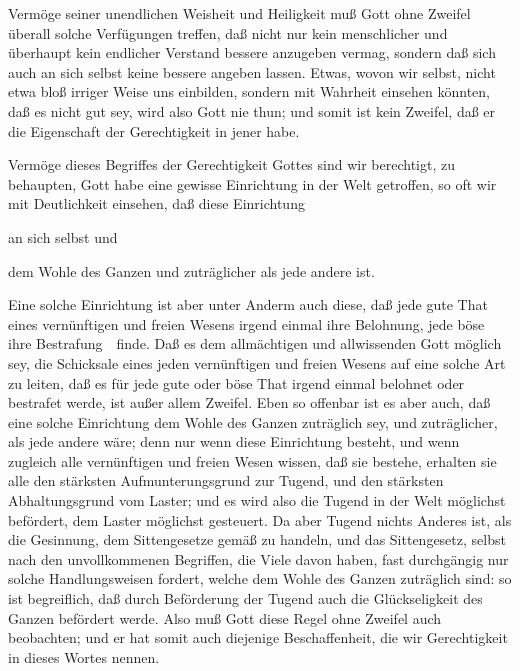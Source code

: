 \begin{aufza}
\item Vermöge seiner unendlichen Weisheit und Heiligkeit muß Gott ohne Zweifel überall solche Verfügungen treffen, daß nicht nur kein menschlicher und überhaupt kein endlicher Verstand bessere anzugeben vermag, sondern daß sich auch an sich selbst keine bessere angeben lassen. Etwas, wovon wir selbst, nicht etwa bloß irriger Weise uns einbilden, sondern mit Wahrheit einsehen könnten, daß es nicht gut sey, wird also Gott nie thun; und somit ist kein Zweifel, daß er die Eigenschaft der Gerechtigkeit in jener  habe.
\item Vermöge dieses Begriffes der Gerechtigkeit Gottes sind wir berechtigt, zu behaupten, Gott habe eine gewisse Einrichtung in der Welt getroffen, so oft wir mit Deutlichkeit einsehen, daß diese Einrichtung
\begin{aufzb}
\item an sich selbst  und
\item dem Wohle des Ganzen  und zuträglicher als jede andere ist.
\end{aufzb}
Eine solche Einrichtung ist aber unter Anderm auch diese, daß jede gute That eines vernünftigen und freien Wesens irgend einmal ihre Belohnung, jede böse ihre Bestrafung~\ finde. Daß es dem allmächtigen und allwissenden Gott möglich sey, die Schicksale eines jeden vernünftigen und freien Wesens auf eine solche Art zu leiten, daß es für jede gute oder böse That irgend einmal belohnet oder bestrafet werde, ist außer allem Zweifel. Eben so offenbar ist es aber auch, daß eine solche Einrichtung dem Wohle des Ganzen zuträglich sey, und zuträglicher, als jede andere wäre; denn nur wenn diese Einrichtung besteht, und wenn zugleich alle vernünftigen und freien Wesen wissen, daß sie bestehe, erhalten sie alle den stärksten Aufmunterungsgrund zur Tugend, und den stärksten Abhaltungsgrund vom Laster; und es wird also die Tugend in der Welt möglichst befördert, dem Laster möglichst gesteuert. Da aber Tugend nichts Anderes ist, als die Gesinnung, dem Sittengesetze gemäß zu handeln, und das Sittengesetz, selbst nach den unvollkommenen Begriffen, die Viele davon haben, fast durchgängig nur solche Handlungsweisen fordert, welche dem Wohle des Ganzen zuträglich sind: so ist begreiflich, daß durch Beförderung der Tugend auch die Glückseligkeit des Ganzen befördert werde. Also muß Gott diese Regel ohne Zweifel auch beobachten; und er hat somit auch diejenige Beschaffenheit, die wir Gerechtigkeit in dieses Wortes  nennen.
\end{aufza}


